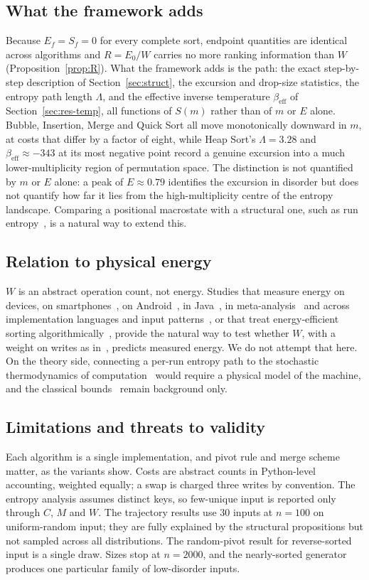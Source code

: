 \documentclass[10pt,journal]{IEEEtran}
\begin{document}
\subsection{What the framework adds}
Because $E_f=S_f=0$ for every complete sort, endpoint quantities are identical across algorithms and $R=E_0/W$ carries no more ranking information than $W$ (Proposition~\ref{prop:R}). What the framework adds is the path: the exact step-by-step description of Section~\ref{sec:struct}, the excursion and drop-size statistics, the entropy path length $\Lambda$, and the effective inverse temperature $\beta_{\mathrm{eff}}$ of Section~\ref{sec:res-temp}, all functions of $S(m)$ rather than of $m$ or $E$ alone. Bubble, Insertion, Merge and Quick Sort all move monotonically downward in $m$, at costs that differ by a factor of eight, while Heap Sort's $\Lambda=3.28$ and $\beta_{\mathrm{eff}}\approx-343$ at its most negative point record a genuine excursion into a much lower-multiplicity region of permutation space. The distinction is not quantified by $m$ or $E$ alone: a peak of $E\approx0.79$ identifies the excursion in disorder but does not quantify how far it lies from the high-multiplicity centre of the entropy landscape. Comparing a positional macrostate with a structural one, such as run entropy~\cite{ref5}, is a natural way to extend this.

\subsection{Relation to physical energy}
$W$ is an abstract operation count, not energy. Studies that measure energy on devices, on smartphones~\cite{ref22}, on Android~\cite{ref23}, in Java~\cite{ref27}, in meta-analysis~\cite{ref26} and across implementation languages and input patterns~\cite{ref32}, or that treat energy-efficient sorting algorithmically~\cite{ref21,ref29}, provide the natural way to test whether $W$, with a weight on writes as in~\cite{ref19}, predicts measured energy. We do not attempt that here. On the theory side, connecting a per-run entropy path to the stochastic thermodynamics of computation~\cite{ref28,ref31} would require a physical model of the machine, and the classical bounds~\cite{ref9,ref10,ref18,ref20,ref25} remain background only.

\subsection{Limitations and threats to validity}
Each algorithm is a single implementation, and pivot rule and merge scheme matter, as the variants show. Costs are abstract counts in Python-level accounting, weighted equally; a swap is charged three writes by convention. The entropy analysis assumes distinct keys, so few-unique input is reported only through $C$, $M$ and $W$. The trajectory results use 30 inputs at $n=100$ on uniform-random input; they are fully explained by the structural propositions but not sampled across all distributions. The random-pivot result for reverse-sorted input is a single draw. Sizes stop at $n=2000$, and the nearly-sorted generator produces one particular family of low-disorder inputs.
\end{document}
